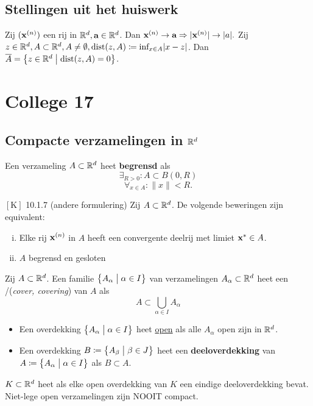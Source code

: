 \documentclass{2wa40summary}
\begin{document}
	\subsection{Stellingen uit het huiswerk}
	\theorem Zij $({\textbf{x}}^{(n)})$ een rij in $\mathbb{R}^d, {\textbf{a}} \in \mathbb{R}^d$. Dan ${\textbf{x}}^{(n)}\to {\textbf{a}} \Rightarrow |{\textbf{x}}^{(n)}|\to |a|.$
	\theorem Zij $z \in \mathbb{R}^d, A \subset \mathbb{R}^d, A \neq \emptyset, \text{dist}(z,A) \coloneqq  \text{inf}_{x\in A}|x-z|$.
	Dan $\overline{A}=\big\{z\in \mathbb{R}^d \bigm| \text{dist}(z,A)=0\big\}$.
	\newpage
	\section{College 17}
	\subsection{Compacte verzamelingen in $\mathbb{R}^d$}
	 Een verzameling $A\subset\mathbb{R}^d$ heet \textbf{begrensd} als \[\exists _{R>0}: A \subset B(0,R)\]
	\[\forall _{x\in A}: \|x\|<R.\]
	
	\theorem $\left[\text{K}\right]$ 10.1.7 (andere formulering)
	Zij $A \subset \mathbb{R}^d$. De volgende beweringen zijn equivalent:
	\begin{enumerate}[(i)]
		\item Elke rij ${\textbf{x}}^{(n)}$ in $A$ heeft een convergente deelrij met limiet ${\textbf{x}}^* \in A$.
		\item $A$ begrensd en gesloten
	\end{enumerate}
	
	 Zij $A \subset \mathbb{R}^d$. Een familie $\big\{A_\alpha \bigm| \alpha \in I \big\}$ van verzamelingen $A_\alpha \subset \mathbb{R}^d$ heet een /(\textit{cover, covering}) van $A$ als \[A \subset \bigcup_{\alpha \in I}A_\alpha\]
	
	\begin{itemize}
		\item Een overdekking $\big\{ A_\alpha \bigm| \alpha \in I \big\}$ heet \underline{open} als alle $A_\alpha$ open zijn in $\mathbb{R}^d$.
		\item Een overdekking $B\coloneqq \big\{ A_\beta \bigm| \beta \in J\big\}$ heet een \textbf{deeloverdekking} van $A\coloneqq \big\{ A_\alpha \bigm| \alpha \in I \big\}$ als $B \subset A$.
	\end{itemize}
	
	 $K \subset \mathbb{R}^d$ heet  als elke open overdekking van $K$ een eindige deeloverdekking bevat.
	\note Niet-lege open verzamelingen zijn NOOIT compact.
	
\end{document}
